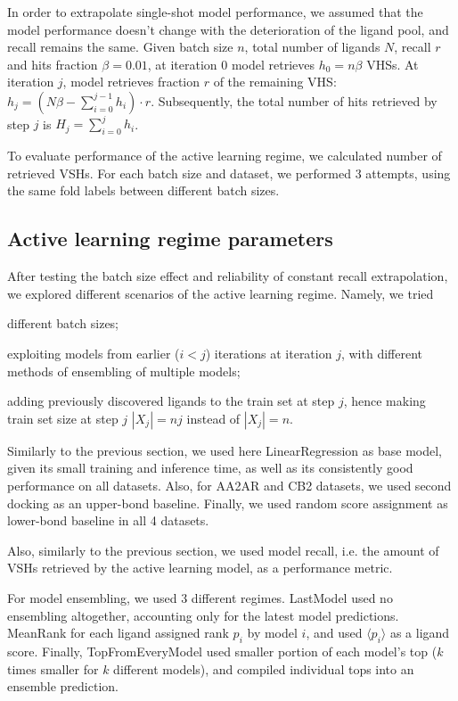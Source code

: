 In order to extrapolate single-shot model performance, we assumed that the model performance doesn't change with the deterioration of the ligand pool, and recall remains the same. Given batch size $n$, total number of ligands $N$, recall $r$ and hits fraction $\beta=0.01$, at iteration 0 model retrieves $h_0 = n\beta$ VHSs. At iteration $j$, model retrieves fraction $r$ of the remaining VHS: $h_j = ( N\beta - \sum_{i=0}^{j-1}h_i ) \cdot r$. Subsequently, the total number of hits retrieved by step $j$ is $H_j = \sum_{i=0}^{j} h_i$.

To evaluate performance of the active learning regime, we calculated number of retrieved VSHs. For each batch size and dataset, we performed 3 attempts, using the same fold labels between different batch sizes.

\subsection{Active learning regime parameters}

After testing the batch size effect and reliability of constant recall extrapolation, we explored different scenarios of the active learning regime. Namely, we tried
\begin{enumerate*}[label=(\roman*)]
    \item different batch sizes;
    \item exploiting models from earlier ($i < j$) iterations at iteration $j$, with different methods of ensembling of multiple models;
    \item adding previously discovered ligands to the train set at step $j$, hence making train set size at step $j$ $|X_j| = nj$ instead of $|X_j|=n$.    
\end{enumerate*}

Similarly to the previous section, we used here LinearRegression as base model, given its small training and inference time, as well as its consistently good performance on all datasets. Also, for AA2AR and CB2 datasets, we used second docking as an upper-bond baseline. Finally, we used random score assignment as lower-bond baseline in all 4 datasets. 

Also, similarly to the previous section, we used model recall, i.e. the amount of VSHs retrieved by the active learning model, as a performance metric.

For model ensembling, we used 3 different regimes. LastModel used no ensembling altogether, accounting only for the latest model predictions. MeanRank for each ligand assigned rank $p_i$ by model $i$, and used $\langle p_i \rangle$ as a ligand score. Finally, TopFromEveryModel used smaller portion of each model's top ($k$ times smaller for $k$ different models), and compiled individual tops into an ensemble prediction.

